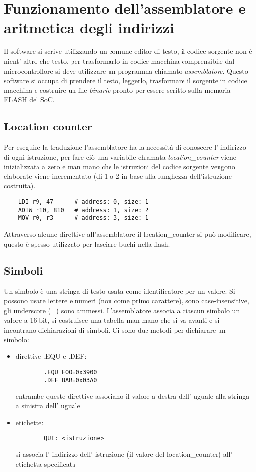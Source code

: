 \section{Funzionamento dell'assemblatore e aritmetica degli indirizzi}
Il software si scrive utilizzando un comune editor di testo, il codice sorgente non è nient' altro che testo, per trasformarlo in codice macchina comprensibile dal microcontrollore si deve utilizzare un programma chiamato \emph{assemblatore}.
Questo software si occupa di prendere il testo, leggerlo, trasformare il sorgente in codice macchina e costruire un file \emph{binario} pronto per essere scritto sulla memoria FLASH del SoC.

\subsection{Location counter}
Per eseguire la traduzione l'assemblatore ha la necessità di conoscere l' indirizzo di ogni istruzione, per fare ciò una variabile chiamata \emph{location\_counter} viene inizializzata a zero e man mano che le istruzioni del codice sorgente vengono elaborate viene incrementato (di 1 o 2 in base alla lunghezza dell'istruzione costruita).
\begin{verbatim}
    LDI r9, 47      # address: 0, size: 1
    ADIW r10, 810   # address: 1, size: 2
    MOV r0, r3      # address: 3, size: 1
\end{verbatim}

Attraverso alcune direttive all'assemblatore il location\_counter si può modificare, questo è spesso utilizzato per lasciare buchi nella flash.

\subsection{Simboli}
Un simbolo è una stringa di testo usata come identificatore per un valore.
Si possono usare lettere e numeri (non come primo carattere), sono case-insensitive, gli underscore (\_) sono ammessi.
L'assemblatore associa a ciascun simbolo un valore a 16 bit, si costruisce una tabella man mano che si va avanti e si incontrano dichiarazioni di simboli.
Ci sono due metodi per dichiarare un simbolo:
\begin{itemize}
    \item direttive .EQU e .DEF:
    \begin{verbatim}
        .EQU FOO=0x3900
        .DEF BAR=0x03A0
    \end{verbatim}
    entrambe queste direttive associano il valore a destra dell' uguale alla stringa a sinistra dell' uguale
    
    \item etichette:
    \begin{verbatim}
        QUI: <istruzione>
    \end{verbatim}
    si associa l' indirizzo dell' istruzione (il valore del location\_counter) all' etichetta specificata
\end{itemize}

